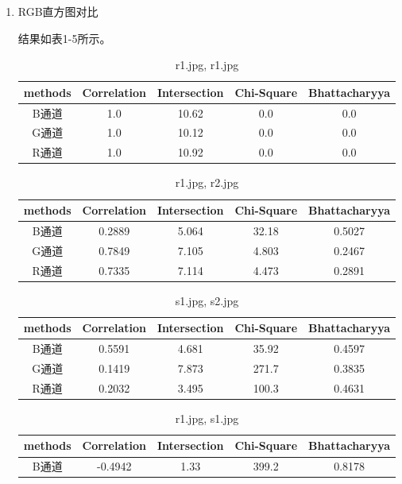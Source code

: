 \documentclass[a4paper, 12pt, UTF8]{article}
\begin{document}
\begin{enumerate}

\item RGB直方图对比

结果如表1-5所示。

\begin{table}[h!]
    \centering
    \caption{r1.jpg, r1.jpg}
    \begin{tabular}{ccccc}
        methods & Correlation & Intersection & Chi-Square & Bhattacharyya \\ \hline
        B通道 & 1.0 & 10.62 & 0.0 & 0.0 \\
        G通道 & 1.0 & 10.12 & 0.0 & 0.0 \\
        R通道 & 1.0 & 10.92 & 0.0 & 0.0 \\
    \end{tabular}
\end{table}
\begin{table}[h!]
    \centering
    \caption{r1.jpg, r2.jpg}
    \begin{tabular}{ccccc}
        methods & Correlation & Intersection & Chi-Square & Bhattacharyya \\ \hline
        B通道 & 0.2889 & 5.064 & 32.18 & 0.5027 \\
        G通道 & 0.7849 & 7.105 & 4.803 & 0.2467 \\
        R通道 & 0.7335 & 7.114 & 4.473 & 0.2891 \\
    \end{tabular}
\end{table}
\begin{table}[h!]
    \centering
    \caption{s1.jpg, s2.jpg}
    \begin{tabular}{ccccc}
        methods & Correlation & Intersection & Chi-Square & Bhattacharyya \\ \hline
        B通道 & 0.5591 & 4.681 & 35.92 & 0.4597 \\
        G通道 & 0.1419 & 7.873 & 271.7 & 0.3835 \\
        R通道 & 0.2032 & 3.495 & 100.3 & 0.4631 \\
    \end{tabular}
\end{table}
\begin{table}[h!]
    \centering
    \caption{r1.jpg, s1.jpg}
    \begin{tabular}{ccccc}
        methods & Correlation & Intersection & Chi-Square & Bhattacharyya \\ \hline
        B通道 & -0.4942 & 1.33 & 399.2 & 0.8178 \\

\end{tabular}
\end{table}
\end{enumerate}
\end{document}
